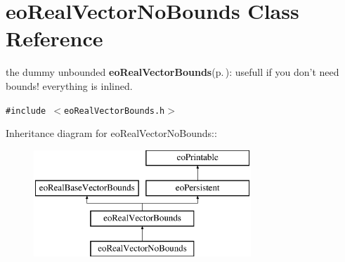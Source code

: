 \section{eo\-Real\-Vector\-No\-Bounds Class Reference}
\label{classeo_real_vector_no_bounds}
the dummy unbounded {\bf eo\-Real\-Vector\-Bounds}{\rm (p.\,\pageref{classeo_real_vector_bounds})}: usefull if you don't need bounds! everything is inlined.  


{\tt \#include $<$eo\-Real\-Vector\-Bounds.h$>$}

Inheritance diagram for eo\-Real\-Vector\-No\-Bounds::\begin{figure}[H]
\begin{center}
\leavevmode
\includegraphics[height=4cm]{classeo_real_vector_no_bounds}
\end{center}
\end{figure}
